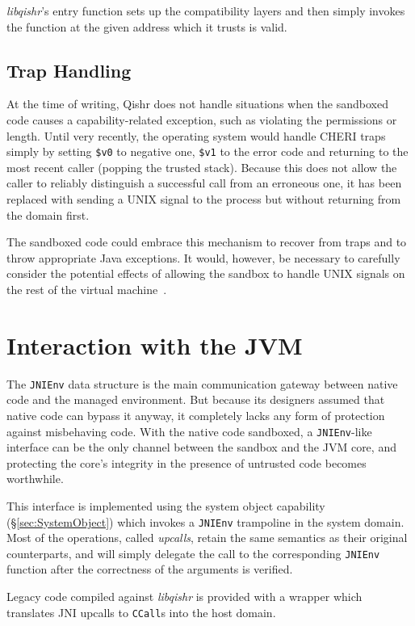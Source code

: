 \documentclass[a4paper,12pt,twoside,openright]{report}
\newcommand{\reg}[1]{\texttt{\$#1}}
\newcommand{\insn}[1]{\texttt{#1}}
\newcommand{\tool}[1]{\emph{#1}}
\newcommand{\lib}[1]{\tool{lib#1}}
\begin{document}
\lib{qishr}'s entry function sets up the compatibility layers and then simply invokes the function at the given address which it trusts is valid. 

\subsection{Trap Handling}

At the time of writing, Qishr does not handle situations when the sandboxed code causes a capability-related exception, such as violating the permissions or length. Until very recently, the operating system would handle CHERI traps simply by setting \reg{v0} to negative one, \reg{v1} to the error code and returning to the most recent caller (popping the trusted stack). Because this does not allow the caller to reliably distinguish a successful call from an erroneous one, it has been replaced with sending a UNIX signal to the process but without returning from the domain first.

The sandboxed code could embrace this mechanism to recover from traps and to throw appropriate Java exceptions. It would, however, be necessary to carefully consider the potential effects of allowing the sandbox to handle UNIX signals on the rest of the virtual machine~\cite{989483}.

\section{Interaction with the JVM}

The \texttt{JNIEnv} data structure is the main communication gateway between native code and the managed environment. But because its designers assumed that native code can bypass it anyway, it completely lacks any form of protection against misbehaving code. With the native code sandboxed, a \texttt{JNIEnv}-like interface can be the only channel between the sandbox and the JVM core, and protecting the core's integrity in the presence of untrusted code becomes worthwhile.

This interface is implemented using the system object capability (\S\ref{sec:SystemObject}) which invokes a \texttt{JNIEnv} trampoline in the system domain. Most of the operations, called \emph{upcalls}, retain the same semantics as their original counterparts, and will simply delegate the call to the corresponding \texttt{JNIEnv} function after the correctness of the arguments is verified. 

Legacy code compiled against \lib{qishr} is provided with a wrapper which translates JNI upcalls to \insn{CCall}s into the host domain.
\end{document}
